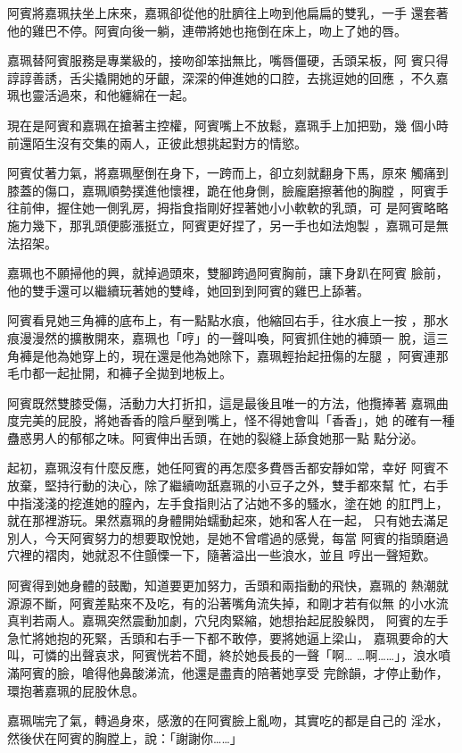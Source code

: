 阿賓將嘉珮扶坐上床來，嘉珮卻從他的肚臍往上吻到他扁扁的雙乳，一手
還套著他的雞巴不停。阿賓向後一躺，連帶將她也拖倒在床上，吻上了她的唇。

嘉珮替阿賓服務是專業級的，接吻卻笨拙無比，嘴唇僵硬，舌頭呆板，阿
賓只得諄諄善誘，舌尖撬開她的牙齦，深深的伸進她的口腔，去挑逗她的回應
，不久嘉珮也靈活過來，和他纏綿在一起。

現在是阿賓和嘉珮在搶著主控權，阿賓嘴上不放鬆，嘉珮手上加把勁，幾
個小時前還陌生沒有交集的兩人，正彼此想挑起對方的情慾。

阿賓仗著力氣，將嘉珮壓倒在身下，一跨而上，卻立刻就翻身下馬，原來
觸痛到膝蓋的傷口，嘉珮順勢撲進他懷裡，跪在他身側，臉龐磨擦著他的胸膛
，阿賓手往前伸，握住她一側乳房，拇指食指剛好捏著她小小軟軟的乳頭，可
是阿賓略略施力幾下，那乳頭便膨漲挺立，阿賓更好捏了，另一手也如法炮製
，嘉珮可是無法招架。

嘉珮也不願掃他的興，就掉過頭來，雙腳跨過阿賓胸前，讓下身趴在阿賓
臉前，他的雙手還可以繼續玩著她的雙峰，她回到到阿賓的雞巴上舔著。

阿賓看見她三角褲的底布上，有一點點水痕，他縮回右手，往水痕上一按
，那水痕漫漫然的擴散開來，嘉珮也「哼」的一聲叫喚，阿賓抓住她的褲頭一
脫，這三角褲是他為她穿上的，現在還是他為她除下，嘉珮輕抬起扭傷的左腿
，阿賓連那毛巾都一起扯開，和褲子全拋到地板上。

阿賓既然雙膝受傷，活動力大打折扣，這是最後且唯一的方法，他攬捧著
嘉珮曲度完美的屁股，將她香香的陰戶壓到嘴上，怪不得她會叫「香香」，她
的確有一種蠱惑男人的郁郁之味。阿賓伸出舌頭，在她的裂縫上舔食她那一點
點分泌。

起初，嘉珮沒有什麼反應，她任阿賓的再怎麼多費唇舌都安靜如常，幸好
阿賓不放棄，堅持行動的決心，除了繼續吻舐嘉珮的小豆子之外，雙手都來幫
忙，右手中指淺淺的挖進她的膣內，左手食指則沾了沾她不多的騷水，塗在她
的肛門上，就在那裡游玩。果然嘉珮的身體開始蠕動起來，她和客人在一起，
只有她去滿足別人，今天阿賓努力的想要取悅她，是她不曾嚐過的感覺，每當
阿賓的指頭磨過穴裡的褶肉，她就忍不住顫慄一下，隨著溢出一些浪水，並且
哼出一聲短歎。

阿賓得到她身體的鼓勵，知道要更加努力，舌頭和兩指動的飛快，嘉珮的
熱潮就源源不斷，阿賓差點來不及吃，有的沿著嘴角流失掉，和剛才若有似無
的小水流真判若兩人。嘉珮突然震動加劇，穴兒肉緊縮，她想抬起屁股躲閃，
阿賓的左手急忙將她抱的死緊，舌頭和右手一下都不敢停，要將她逼上梁山，
嘉珮要命的大叫，可憐的出聲哀求，阿賓恍若不聞，終於她長長的一聲「啊…
…啊……」，浪水噴滿阿賓的臉，嗆得他鼻酸涕流，他還是盡責的陪著她享受
完餘韻，才停止動作，環抱著嘉珮的屁股休息。

嘉珮喘完了氣，轉過身來，感激的在阿賓臉上亂吻，其實吃的都是自己的
淫水，然後伏在阿賓的胸膛上，說：「謝謝你……」

